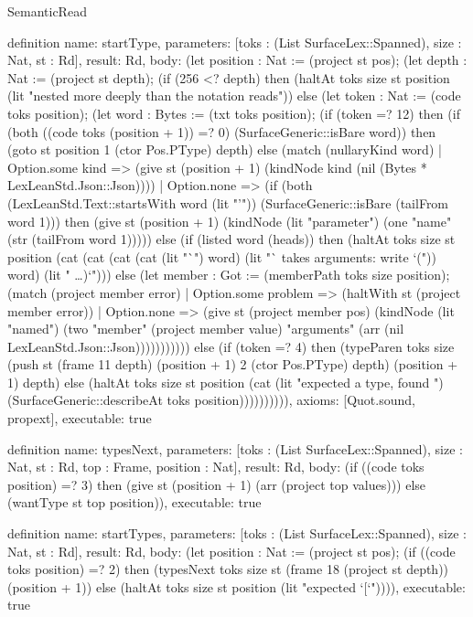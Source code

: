\begin{lexlean}{SemanticRead}
\begin{semanticmodule}
definition{
  name: startType,
  parameters: [toks : (List SurfaceLex::Spanned), size : Nat, st : Rd],
  result: Rd,
  body: (let position : Nat := (project st pos); (let depth : Nat := (project st depth); (if (256 <? depth) then (haltAt toks size st position (lit "nested more deeply than the notation reads")) else (let token : Nat := (code toks position); (let word : Bytes := (txt toks position); (if (token =? 12) then (if (both ((code toks (position + 1)) =? 0) (SurfaceGeneric::isBare word)) then (goto st position 1 (ctor Pos.PType) depth) else (match (nullaryKind word)
    | Option.some kind => (give st (position + 1) (kindNode kind (nil (Bytes * LexLeanStd.Json::Json))))
    | Option.none => (if (both (LexLeanStd.Text::startsWith word (lit "'")) (SurfaceGeneric::isBare (tailFrom word 1))) then (give st (position + 1) (kindNode (lit "parameter") (one "name" (str (tailFrom word 1))))) else (if (listed word (heads)) then (haltAt toks size st position (cat (cat (cat (cat (lit "`") word) (lit "` takes arguments: write `(")) word) (lit " …)`"))) else (let member : Got := (memberPath toks size position); (match (project member error)
      | Option.some problem => (haltWith st (project member error))
      | Option.none => (give st (project member pos) (kindNode (lit "named") (two "member" (project member value) "arguments" (arr (nil LexLeanStd.Json::Json))))))))))) else (if (token =? 4) then (typeParen toks size (push st (frame 11 depth) (position + 1) 2 (ctor Pos.PType) depth) (position + 1) depth) else (haltAt toks size st position (cat (lit "expected a type, found ") (SurfaceGeneric::describeAt toks position)))))))))),
  axioms: [Quot.sound, propext],
  executable: true
}

definition{
  name: typesNext,
  parameters: [toks : (List SurfaceLex::Spanned), size : Nat, st : Rd, top : Frame, position : Nat],
  result: Rd,
  body: (if ((code toks position) =? 3) then (give st (position + 1) (arr (project top values))) else (wantType st top position)),
  executable: true
}

definition{
  name: startTypes,
  parameters: [toks : (List SurfaceLex::Spanned), size : Nat, st : Rd],
  result: Rd,
  body: (let position : Nat := (project st pos); (if ((code toks position) =? 2) then (typesNext toks size st (frame 18 (project st depth)) (position + 1)) else (haltAt toks size st position (lit "expected `[`")))),
  executable: true
}


\end{semanticmodule}
\end{lexlean}
